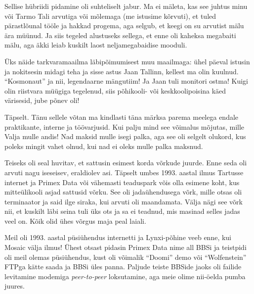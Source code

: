 Sellise hübriidi pidamine oli suhteliselt jabur. Ma ei mäleta, kas see juhtus minu 
või Tarmo Tali arvutiga või mõlemaga (me 
istusime kõrvuti), et tuled pärastlõunal tööle ja hakkad
progema, aga selgub, et keegi on su arvutist mälu ära müünud. Ja siis 
tegeled alustuseks sellega, et enne oli kaheksa megabaiti mälu, aga äkki leiab kuskilt
laost neljamegabaidise mooduli.

Üks näide tarkvaramaailma läbipõimumisest muu maailmaga: ühel päeval istusin ja 
nokitsesin midagi teha ja sisse astus Jaan Tallinn, 
kellest ma olin kuulnud. \enquote{Kosmonaut} ja nii, legendaarne mängutiim! Ja Jaan tuli 
monitori ostma! Kuigi olin riistvara müügiga tegelenud, siis põhikooli- või keskkoolipoisina käed värisesid, 
jube põnev oli!


Täpselt. Tänu sellele võtan ma kindlasti täna märksa
parema meelega endale praktikante, interne ja töövarjusid. Kui palju mind see 
võimalus mõjutas, mille Valja  mulle 
andis! Nad maksid mulle isegi palka, aga see oli selgelt olukord, kus poleks 
mingit vahet olnud, kui nad ei oleks mulle palka maksnud.

Teiseks oli seal huvitav, et sattusin esimest korda võrkude 
juurde. Enne seda oli arvuti nagu iseseisev, eraldiolev asi. Täpselt umbes 1993. aastal ilmus
Tartusse internet ja Primex Data 
või vähemasti teaduspark võis olla esimene koht, kus 
mitteülikooli asjad sattusid võrku. See oli jadaühendusega võrk, mille otsas oli 
terminaator ja said ilge siraka, kui arvuti oli maandamata. Välja nägi see võrk
nii, et kuskilt läbi seina tuli üks ots ja sa ei teadnud, mis 
masinad selles jadas veel on. Kõik olid ühes võrgus maja peal laiali. 

Meil oli 
1993. aastal püsiühendus internetti ja Lynxi-põhine veeb enne, kui Mosaic 
välja ilmus! Ühest otsast pidasin Primex Data nime all BBSi ja teistpidi 
oli meil olemas püsiühendus, kust oli võimalik 
\enquote{Doomi} demo või \enquote{Wolfenstein} 
FTPga kätte saada ja BBSi üles panna. Paljude teiste 
BBSide jaoks oli failide levitamine modemiga 
\emph{peer-to-peer} loksutamine, aga meie olime nii-öelda pumba juures. 

